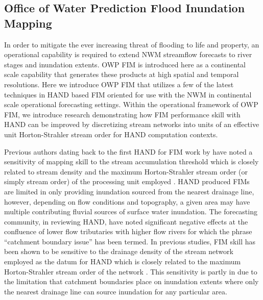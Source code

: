 \documentclass[draft]{dependencies/agujournal2019}
\begin{document}
\subsection{Office of Water Prediction Flood Inundation Mapping}
\label{ssec:owp_fim}
%
In order to mitigate the ever increasing threat of flooding to life and property, an operational capability is required to extend NWM streamflow forecasts to river stages and inundation extents.
OWP FIM is introduced here as a continental scale capability that generates these products at high spatial and temporal resolutions.
Here we introduce OWP FIM that utilizes a few of the latest techniques in HAND based FIM oriented for use with the NWM in continental scale operational forecasting settings. 
Within the operational framework of OWP FIM, we introduce research demonstrating how FIM performance skill with HAND can be improved by discretizing stream networks into units of an effective unit Horton-Strahler stream order \cite{horton1945erosional,strahler1952hypsometric,strahler1952hypsometric} for HAND computation contexts.

Previous authors dating back to the first HAND for FIM work by  have noted a sensitivity of mapping skill to the stream accumulation threshold which is closely related to stream density and the maximum Horton-Strahler stream order (or simply stream order) of the processing unit employed \cite{zhang2018comparative,mcgehee2016modified,li2020evaluation}.
HAND produced FIMs are limited in only providing inundation sourced from the nearest drainage line, however, depending on flow conditions and topography, a given area may have multiple contributing fluvial sources of surface water inundation.
The forecasting community, in reviewing HAND, have noted significant negative effects at the confluence of lower flow tributaries with higher flow rivers for which the phrase ``catchment boundary issue'' has been termed.
In previous studies, FIM skill has been shown to be sensitive to the drainage density of the stream network employed as the datum for HAND which is closely related to the maximum Horton-Strahler stream order of the network \cite{zhang2018comparative,mcgehee2016modified,li2020evaluation,nobre2016hand}.
This sensitivity is partly in due to the limitation that catchment boundaries place on inundation extents where only the nearest drainage line can source inundation for any particular area.
\end{document}
